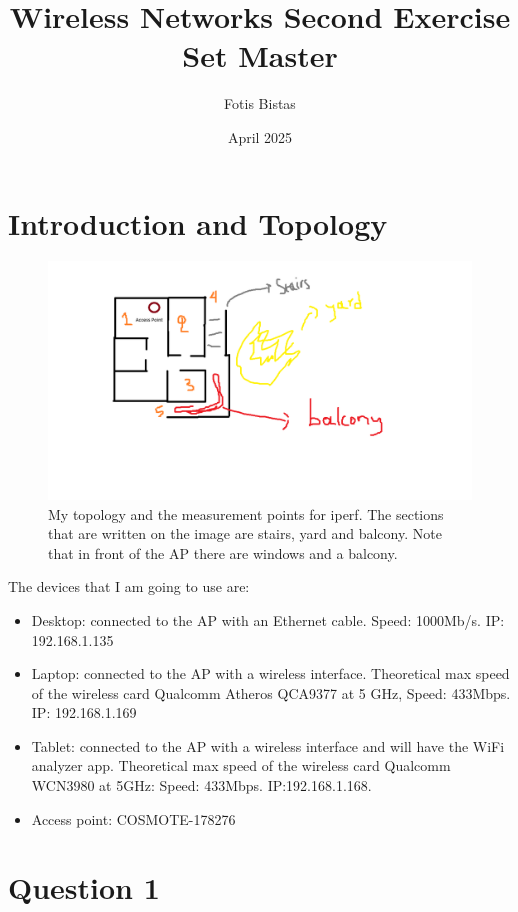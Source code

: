 \documentclass{article}
\title{Wireless Networks Second Exercise Set Master}
\author{Fotis Bistas}
\date{April 2025}
\begin{document}
\maketitle
\tableofcontents

\section{Introduction and Topology}
\begin{figure}[H]
    \centering
    \includegraphics[width=1.5\textwidth]{images/topology.png}
    \caption{My topology and the measurement points for iperf. The sections that are written on the image are stairs, yard and balcony. Note that in front of the AP there are windows and a balcony.}
    \label{fig:topology}
\end{figure}

The devices that I am going to use are: 

\begin{itemize}
    \item Desktop: connected to the AP with an Ethernet cable. Speed: 1000Mb/s. IP: 192.168.1.135
    \item Laptop: connected to the AP with a wireless interface. Theoretical max speed of the wireless card Qualcomm Atheros QCA9377 at 5 GHz, Speed: 433Mbps. IP: 192.168.1.169
    \item Tablet: connected to the AP with a wireless interface and will have the WiFi analyzer app. Theoretical max speed of the wireless card Qualcomm WCN3980 at 5GHz: Speed: 433Mbps. IP:192.168.1.168.
    \item Access point: COSMOTE-178276
\end{itemize}
\section{Question 1}
\end{document}
